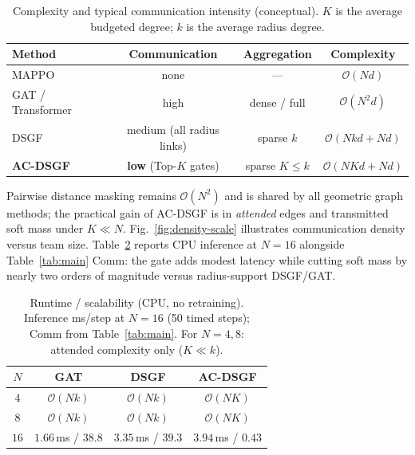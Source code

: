 \begin{table}[t]
\centering
\caption{Complexity and typical communication intensity (conceptual).
$K$ is the average budgeted degree; $k$ is the average radius degree.}
\label{tab:complexity}
\begin{tabular}{lccc}
\toprule
Method & Communication & Aggregation & Complexity \\
\midrule
MAPPO & none & --- & $\mathcal{O}(Nd)$ \\
GAT / Transformer & high & dense / full & $\mathcal{O}(N^{2}d)$ \\
DSGF & medium (all radius links) & sparse $k$ & $\mathcal{O}(Nkd+Nd)$ \\
\textbf{AC-DSGF} & \textbf{low} (Top-$K$ gates) & sparse $K{\le}k$ &
$\mathcal{O}(NKd+Nd)$ \\
\bottomrule
\end{tabular}
\end{table}

\noindent
Pairwise distance masking remains $\mathcal{O}(N^{2})$ and is shared by all
geometric graph methods; the practical gain of AC-DSGF is in
\emph{attended} edges and transmitted soft mass under $K\ll N$.
Fig.~\ref{fig:density-scale} illustrates communication density versus team size.
Table~\ref{tab:compute} reports CPU inference at $N{=}16$ alongside
Table~\ref{tab:main} Comm: the gate adds modest latency while cutting soft
mass by nearly two orders of magnitude versus radius-support DSGF/GAT.

\begin{table}[t]
\centering
\caption{Runtime / scalability (CPU, no retraining).
Inference ms/step at $N{=}16$ (50 timed steps); Comm from Table~\ref{tab:main}.
For $N{=}4,8$: attended complexity only ($K{\ll}k$).}
\label{tab:compute}
\begin{tabular}{cccc}
\toprule
$N$ & GAT & DSGF & AC-DSGF \\
\midrule
$4$  & $\mathcal{O}(Nk)$ & $\mathcal{O}(Nk)$ & $\mathcal{O}(NK)$ \\
$8$  & $\mathcal{O}(Nk)$ & $\mathcal{O}(Nk)$ & $\mathcal{O}(NK)$ \\
$16$ & $1.66$\,ms / $38.8$ &
$3.35$\,ms / $39.3$ &
$\mathbf{3.94}$\,ms / $\mathbf{0.43}$ \\
\bottomrule
\end{tabular}
\end{table}
